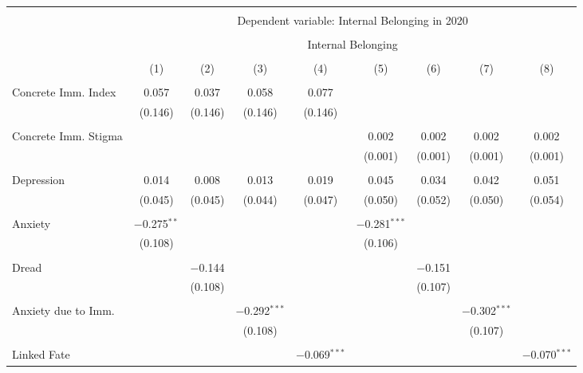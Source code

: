 
\begin{table}[!htbp] \centering 
  \caption{} 
  \label{} 
\begin{tabular}{@{\extracolsep{5pt}}lcccccccc} 
\\[-1.8ex]\hline 
\hline \\[-1.8ex] 
 & \multicolumn{8}{c}{Dependent variable: Internal Belonging in 2020} \\ 
\cline{2-9} 
\\[-1.8ex] & \multicolumn{8}{c}{Internal Belonging} \\ 
\\[-1.8ex] & (1) & (2) & (3) & (4) & (5) & (6) & (7) & (8)\\ 
\hline \\[-1.8ex] 
 Concrete Imm. Index & 0.057 & 0.037 & 0.058 & 0.077 &  &  &  &  \\ 
  & (0.146) & (0.146) & (0.146) & (0.146) &  &  &  &  \\ 
  & & & & & & & & \\ 
 Concrete Imm. Stigma &  &  &  &  & 0.002 & 0.002 & 0.002 & 0.002 \\ 
  &  &  &  &  & (0.001) & (0.001) & (0.001) & (0.001) \\ 
  & & & & & & & & \\ 
 Depression & 0.014 & 0.008 & 0.013 & 0.019 & 0.045 & 0.034 & 0.042 & 0.051 \\ 
  & (0.045) & (0.045) & (0.044) & (0.047) & (0.050) & (0.052) & (0.050) & (0.054) \\ 
  & & & & & & & & \\ 
 Anxiety & $-$0.275$^{**}$ &  &  &  & $-$0.281$^{***}$ &  &  &  \\ 
  & (0.108) &  &  &  & (0.106) &  &  &  \\ 
  & & & & & & & & \\ 
 Dread &  & $-$0.144 &  &  &  & $-$0.151 &  &  \\ 
  &  & (0.108) &  &  &  & (0.107) &  &  \\ 
  & & & & & & & & \\ 
 Anxiety due to Imm. &  &  & $-$0.292$^{***}$ &  &  &  & $-$0.302$^{***}$ &  \\ 
  &  &  & (0.108) &  &  &  & (0.107) &  \\ 
  & & & & & & & & \\ 
 Linked Fate &  &  &  & $-$0.069$^{***}$ &  &  &  & $-$0.070$^{***}$ \\ 

\end{tabular}
\end{table}
